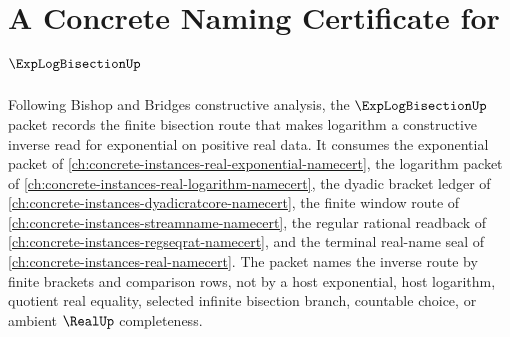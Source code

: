\chapter{A Concrete Naming Certificate for $\ExpLogBisectionUp$}
\label{ch:concrete-instances-exp-log-bisection-namecert}

Following Bishop and Bridges constructive analysis, the $\ExpLogBisectionUp$ packet records the finite bisection route that makes logarithm a constructive inverse read for exponential on positive real data. It consumes the exponential packet of \autoref{ch:concrete-instances-real-exponential-namecert}, the logarithm packet of \autoref{ch:concrete-instances-real-logarithm-namecert}, the dyadic bracket ledger of \autoref{ch:concrete-instances-dyadicratcore-namecert}, the finite window route of \autoref{ch:concrete-instances-streamname-namecert}, the regular rational readback of \autoref{ch:concrete-instances-regseqrat-namecert}, and the terminal real-name seal of \autoref{ch:concrete-instances-real-namecert}. The packet names the inverse route by finite brackets and comparison rows, not by a host exponential, host logarithm, quotient real equality, selected infinite bisection branch, countable choice, or ambient $\RealUp$ completeness.

